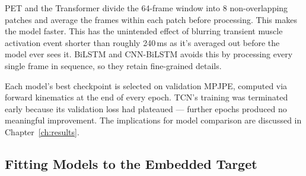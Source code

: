 \documentclass[11pt]{article}
\begin{document}
\begin{table}[H]
\centering
\caption{Model architectures and training hyperparameters ($\eta_0$: initial LR; WD: weight decay; DO: dropout; $h$: hidden units; $d$: model dim; $s$: external memory size; Patch($P$): frames per token).}
\label{tab:arch}
\end{table}

PET and the Transformer divide the 64-frame window into 8 non-overlapping patches and average the frames within each patch before processing. This makes the model faster. This has the unintended effect of blurring transient muscle activation event shorter than roughly 240\,ms  as it's averaged out before the model ever sees it. BiLSTM and CNN-BiLSTM avoids this by processing every single frame in sequence, so they retain fine-grained details.


Each model's best checkpoint is selected on validation MPJPE, computed via forward kinematics at the end of every epoch. TCN's training was terminated early because its validation loss had plateaued — further epochs produced no meaningful improvement. The implications for model comparison are discussed in Chapter~\ref{ch:results}.

\subsection{Fitting Models to the Embedded Target}
\label{sec:quant}
\end{document}
